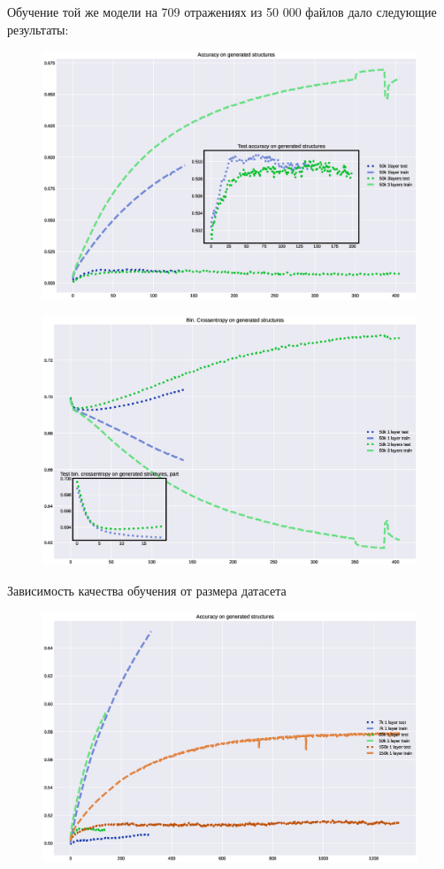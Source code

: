 \documentclass{article}
\begin{document}
Обучение той же модели на 709 отражениях из 50 000 файлов дало следующие результаты: 


\begin{figure}[h!tp]
\centering
\includegraphics[scale=.500]{imgs/acc-50k.eps}
\caption{}
\label{}
\end{figure}
\begin{figure}[h!tp]
\centering
\includegraphics[scale=.500]{imgs/loss-50k.eps}
\caption{}
\label{}
\end{figure}

Зависимость качества обучения от размера датасета
\begin{figure}[h!tp]
\centering
\includegraphics[scale=.500]{imgs/acc-1l_ndata.eps}
\caption{}
\label{}
\end{figure}
\end{document}
